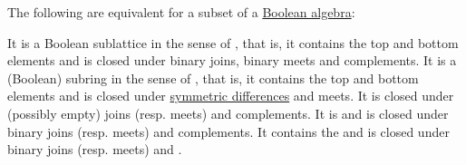 \begin{proposition}\label{thm:boolean_subalgebra}
  The following are equivalent for a subset of a \hyperref[def:boolean_algebra]{Boolean algebra}:
  \begin{thmenum}
     It is a Boolean sublattice in the sense of , that is, it contains the top and bottom elements and is closed under binary joins, binary meets and complements.
     It is a (Boolean) subring in the sense of , that is, it contains the top and bottom elements and is closed under \hyperref[def:symmetric_difference]{symmetric differences} and meets.
     It is closed under (possibly empty)  joins (resp. meets) and complements.
     It is  and is closed under binary joins (resp. meets) and complements.
     It contains the  and is closed under binary joins (resp. meets) and \hyperref[def:boolean_algebra_difference]{}.
  \end{thmenum}
\end{proposition}
